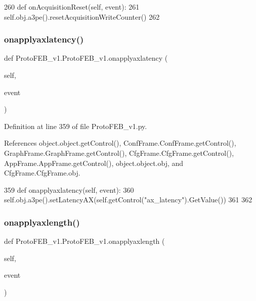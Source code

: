 \begin{DoxyCode}
260     \textcolor{keyword}{def }onAcquisitionReset(self, event):
261         self.obj.a3pe().resetAcquisitionWriteCounter()
262 
\end{DoxyCode}
\mbox{\label{classProtoFEB__v1_1_1ProtoFEB__v1_a99efa326b380d20b35277081583d7e1f}} 
\subsubsection{\texorpdfstring{onapplyaxlatency()}{onapplyaxlatency()}}
{\footnotesize\ttfamily def Proto\+F\+E\+B\+\_\+v1.\+Proto\+F\+E\+B\+\_\+v1.\+onapplyaxlatency (\begin{DoxyParamCaption}\item[{}]{self,  }\item[{}]{event }\end{DoxyParamCaption})}



Definition at line 359 of file Proto\+F\+E\+B\+\_\+v1.\+py.



References object.\+object.\+get\+Control(), Conf\+Frame.\+Conf\+Frame.\+get\+Control(), Graph\+Frame.\+Graph\+Frame.\+get\+Control(), Cfg\+Frame.\+Cfg\+Frame.\+get\+Control(), App\+Frame.\+App\+Frame.\+get\+Control(), object.\+object.\+obj, and Cfg\+Frame.\+Cfg\+Frame.\+obj.


\begin{DoxyCode}
359     \textcolor{keyword}{def }onapplyaxlatency(self, event):
360         self.obj.a3pe().setLatencyAX(self.getControl(\textcolor{stringliteral}{"ax\_latency"}).GetValue())
361 
362 
\end{DoxyCode}
\mbox{\label{classProtoFEB__v1_1_1ProtoFEB__v1_a3f04a3f93366082ad95de91d1457fdf5}} 
\subsubsection{\texorpdfstring{onapplyaxlength()}{onapplyaxlength()}}
{\footnotesize\ttfamily def Proto\+F\+E\+B\+\_\+v1.\+Proto\+F\+E\+B\+\_\+v1.\+onapplyaxlength (\begin{DoxyParamCaption}\item[{}]{self,  }\item[{}]{event }\end{DoxyParamCaption})}



